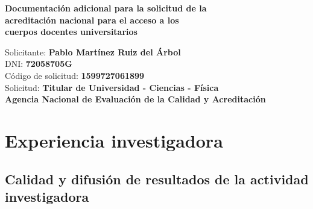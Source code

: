 \documentclass[a4paper, 11pt, twoside, openright]{report}
\begin{document}

\begin{titlepage}

	\vspace*{5.5cm}
	\centering

	{\huge\bfseries Documentación adicional para la solicitud de la \\ \vspace*{1cm}
	                acreditación nacional para el acceso a los\\ \vspace*{1cm}
                        cuerpos docentes universitarios}
	
	\begin{flushleft}
	
	\vspace{6.6cm}
	{\Large Solicitante: \textbf{Pablo Martínez Ruiz del Árbol}\\}
	{\Large DNI: \textbf{72058705G}\\}
	{\Large Código de solicitud: \textbf{1599727061899}\\}
	{\Large Solicitud: \textbf{Titular de Universidad - Ciencias - Física}\\}
	{\Large \textbf{Agencia Nacional de Evaluación de la Calidad y Acreditación}}
	\vfill
	
	\end{flushleft}

\end{titlepage}

\tableofcontents
\clearpage
\thispagestyle{empty}
\phantom{a}
\vfill
\newpage


\setcounter{page}{1}

\renewcommand\thechapter{\arabic{chapter}}
\renewcommand\thesection{\thechapter.\Alph{section}}
\renewcommand\thesubsection{\thesection.\arabic{subsection}}
\renewcommand\thesubsubsection{\thesubsection.\arabic{subsubsection}}

\chapter{Experiencia investigadora}

\section{Calidad y difusión de resultados de la actividad investigadora}
\end{document}
